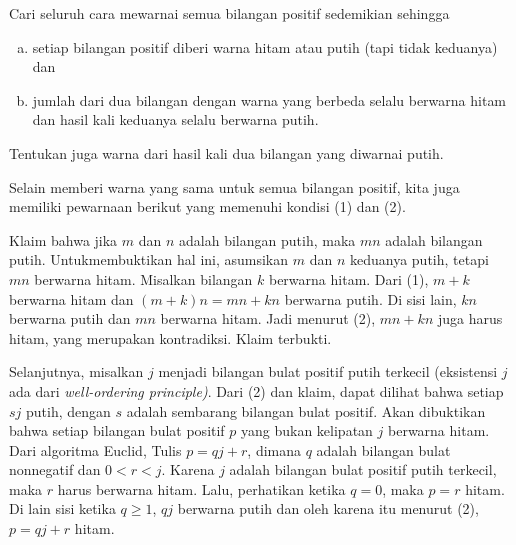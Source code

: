 \documentclass[11pt]{scrartcl}
\begin{document}
\begin{soaljawab}
    Cari seluruh cara mewarnai semua bilangan positif sedemikian sehingga 
    \begin{enumerate}[(a)]
        \item setiap bilangan positif diberi warna hitam atau putih (tapi tidak keduanya) dan \item jumlah dari dua bilangan dengan warna yang berbeda selalu berwarna hitam dan hasil kali keduanya selalu berwarna putih.
    \end{enumerate}
     
    Tentukan juga warna dari hasil kali dua bilangan yang diwarnai putih.

    \begin{solusi}
        Selain memberi warna yang sama untuk semua bilangan positif, kita juga memiliki pewarnaan berikut yang memenuhi kondisi (1) dan (2). 
        
        Klaim bahwa jika $m$ dan $n$ adalah bilangan putih, maka $mn$ adalah bilangan putih. Untukmembuktikan hal ini, asumsikan $m$ dan $n$ keduanya putih, tetapi $mn$ berwarna hitam. Misalkan bilangan $k$ berwarna hitam. Dari (1), $m+k$ berwarna hitam dan $(m+k)n = mn+kn$ berwarna putih. Di sisi lain, $kn$ berwarna putih dan $mn$ berwarna hitam. Jadi menurut (2), $mn+kn$ juga harus hitam, yang merupakan kontradiksi. Klaim terbukti.
        
        Selanjutnya, misalkan $j$ menjadi bilangan bulat positif putih terkecil (eksistensi $j$ ada dari \textit{well-ordering principle)}. Dari (2) dan klaim, dapat dilihat bahwa setiap $sj$ putih, dengan $s$ adalah sembarang bilangan bulat positif. Akan dibuktikan bahwa setiap bilangan bulat positif $p$ yang bukan kelipatan $j$ berwarna hitam. Dari algoritma Euclid, Tulis $p = qj+r$, dimana $q$ adalah bilangan bulat nonnegatif dan $0 < r < j$. Karena $j$ adalah bilangan bulat positif putih terkecil, maka $r$ harus berwarna hitam. Lalu, perhatikan ketika $q = 0$, maka $p = r$ hitam. Di lain sisi ketika $q \ge 1$, $qj$ berwarna putih dan oleh karena itu menurut (2), $p = qj+r$ hitam.
    \end{solusi}
\end{soaljawab}
\end{document}
